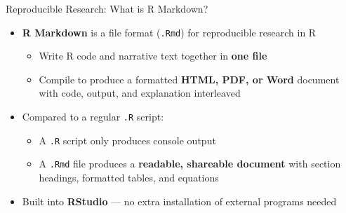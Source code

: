 \documentclass[dvipsnames,hyperref={pdfpagelabels=false}]{beamer}
\begin{document}
\begin{frame}{Reproducible Research: What is R Markdown?}

	\begin{itemize}
		\item \textbf{R Markdown} is a file format (\texttt{.Rmd}) for reproducible research in R
		\vspace{0.3cm}
		\begin{itemize}
			\item Write R code and narrative text together in \textbf{one file}
			\vspace{0.2cm}
			\item Compile to produce a formatted \textbf{HTML, PDF, or Word} document with code, output, and explanation interleaved
		\end{itemize}
		\vspace{0.3cm}
		\item Compared to a regular \texttt{.R} script:
		\vspace{0.2cm}
		\begin{itemize}
			\item A \texttt{.R} script only produces console output
			\vspace{0.2cm}
			\item A \texttt{.Rmd} file produces a \textbf{readable, shareable document} with section headings, formatted tables, and equations
		\end{itemize}
		\vspace{0.3cm}
		\item Built into \textbf{RStudio} --- no extra installation of external programs needed
	\end{itemize}

\end{frame}
\end{document}

